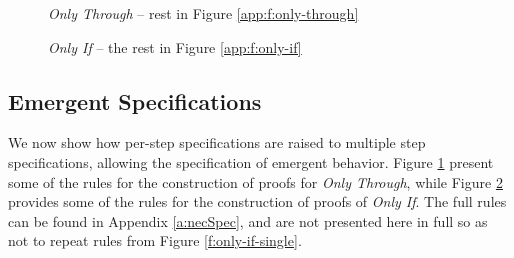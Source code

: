\begin{figure}[t]
\footnotesize
{}
\caption{ \emph{Only Through} -- rest in Figure \ref{app:f:only-through}}
\label{f:only-through}
\end{figure}
\begin{figure}[t]
\footnotesize
{}
\caption{ \emph{Only If} -- the rest in Figure \ref{app:f:only-if}}
\label{f:only-if}
\end{figure}





%
\subsection{Emergent \Nec Specifications}
\label{s:emergent-proof}

We now show how per-step \Nec specifications are raised to 
multiple step \Nec specifications, allowing the specification
of emergent behavior. Figure \ref{f:only-through} present some of the rules for the 
construction of proofs for \emph{Only Through}, while Figure \ref{f:only-if}
provides some of the rules for the construction of proofs of \emph{Only If}. 
The full rules can be found in Appendix \ref{a:necSpec}, and are not presented here 
in full so as not to repeat rules from Figure \ref{f:only-if-single}.


